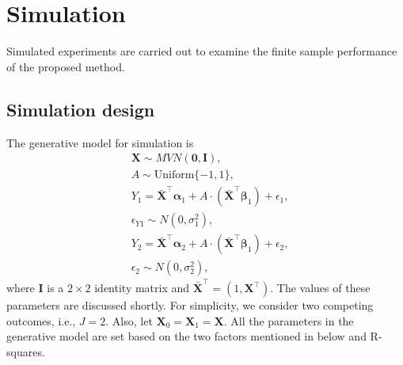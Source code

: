 \documentclass{article}
\newcommand{\itl}{\intercal}
\newcommand{\bs}{ \boldsymbol}
\begin{document}
\section{Simulation}
%

 Simulated experiments are carried out to examine the finite sample performance of the proposed method. 
\subsection{Simulation design}
The generative model for simulation is 
\begin{equation*}
\begin{aligned}
& \bs{X} \sim MVN(\bs{0}, \bs{I}),\\
& A \sim \text{Uniform}\{ -1, 1\}, \\
& Y_1 =  \bar{\bs{X}}^{\itl}\bs{\alpha}_{1} + A \cdot (\bar{\bs{X}}^{\itl}\bs{\beta}_{1}) + \epsilon_{1}, \\
& \epsilon_{Y1} \sim N(0, \sigma^{2}_{1}), \\
& Y_2 = \bar{\bs{X}}^{\itl}\bs{\alpha}_{2} + A\cdot(\bar{\bs{X}}^{\itl}\bs{\beta}_{1}) + \epsilon_{2}, \\
& \epsilon_2 \sim N(0, \sigma^{2}_2),
\end{aligned}
\end{equation*}
where $\bs{I}$ is a $2\times2$ identity matrix and $\bar{\bs{X}}^{\itl} = (1, \bs{X}^{\itl})$. The values of these parameters are discussed shortly. For simplicity, we consider two competing outcomes, i.e., $J=2$. Also, let $\bs{X}_0 = \bs{X}_1 = \bs{X}$. 
All the parameters in the generative model are set based on the two factors mentioned in below and R-squares.\\
\end{document}

